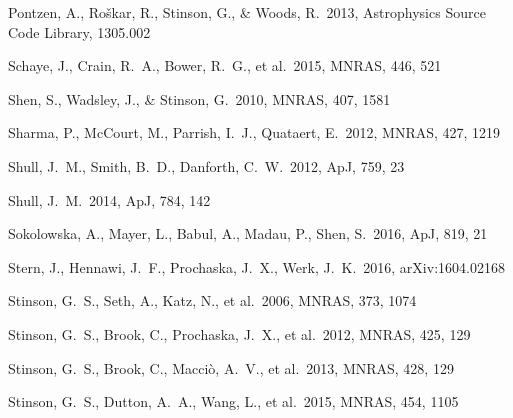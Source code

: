 \documentclass[useAMS,usenatbib]{mn2e}
\def \apj {ApJ}
\def \mnras {MNRAS}
\begin{document}
\begin{thebibliography}{}
 Pontzen, A., Ro{\v s}kar, R., Stinson, G., \& Woods, R.\ 2013, Astrophysics Source Code Library, 1305.002 





 Schaye, J., Crain,
  R.~A., Bower, R.~G., et al.\ 2015, \mnras, 446, 521

  
 Shen, S., Wadsley, J., 
\& Stinson, G.\ 2010, \mnras, 407, 1581 

Sharma, P., McCourt, M., Parrish, I.~J., Quataert, E.\ 2012, \mnras, 427, 1219

Shull, J.~M., Smith, B.~D., Danforth, C.~W.\ 2012, \apj, 759, 23

%
 Shull, J.~M.\ 2014, \apj, 784, 142

Sokolowska, A., Mayer, L., Babul, A., Madau, P., Shen, S.\ 2016, \apj, 819, 21

Stern, J., Hennawi, J.~F., Prochaska, J.~X., Werk, J.~K.\ 2016, arXiv:1604.02168

 Stinson, G.~S., Seth, A., Katz, N., et al.\ 2006, \mnras, 373, 1074

%
 Stinson, G.~S., Brook, C., Prochaska, J.~X., et al.\ 2012, \mnras, 425, 129

 Stinson, G.~S., Brook, 
C., Macci{\`o}, A.~V., et al.\ 2013, \mnras, 428, 129 

 Stinson, G.~S., Dutton, A.~A., Wang, L., et al.\ 2015, \mnras, 454, 1105 


\end{thebibliography}
\end{document}
